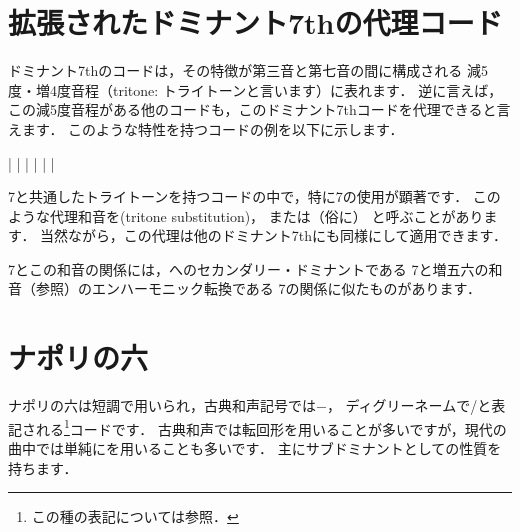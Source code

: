 \documentclass[dvipdfmx,uplatex,b5paper,openany,jbase=12Q,nomag*,textwidth-limit=44%
               ]{gachimuchi}
\begin{document}
\section{拡張されたドミナント7thの代理コード}
ドミナント7thのコードは，その特徴が第三音と第七音の間に構成される
減5度・増4度音程（tritone: トライトーンと言います）に表れます．
逆に言えば，この減5度音程がある他のコードも，このドミナント7thコードを代理できると言えます．
このような特性を持つコードの例を以下に示します．

\begin{Music}[0.7\linewidth]
  \generalmeter{\meterC}
  \Startpiece
  \NOTes%
  |%
  \en\doublebar%
  \NOTes%
  |%
  \en\bar%
  \NOTes%
  |%
  \en\bar%
  \NOTes%
  |%
  \en\setdoublebar%
  \endpiece
\end{Music}

\Gnv\subsc7と共通したトライトーンを持つコードの中で，特に\bFlat\Gnii\subsc7の使用が顕著です．
このような代理和音を\xkanjispace(tritone substitution)，
または（俗に） と呼ぶことがあります．
当然ながら，この代理は他のドミナント7thにも同様にして適用できます．

\Gnv\subsc7とこの和音の関係には，\Gnv へのセカンダリー・ドミナントである
\Gnii\subsc7と増五六の和音（参照）のエンハーモニック転換である
\bFlat\Gnvi\subsc7の関係に似たものがあります．

\section{ナポリの六}
ナポリの六は短調で用いられ，古典和声記号では$-$\Gnii{}，
ディグリーネームで\bFlat\Gnii /\Gniv と表記される\footnote{
  この種の表記については参照．
}コードです．
古典和声では転回形を用いることが多いですが，現代の曲中では単純に\bFlat\Gnii を用いることも多いです．
主にサブドミナントとしての性質を持ちます．
\end{document}
